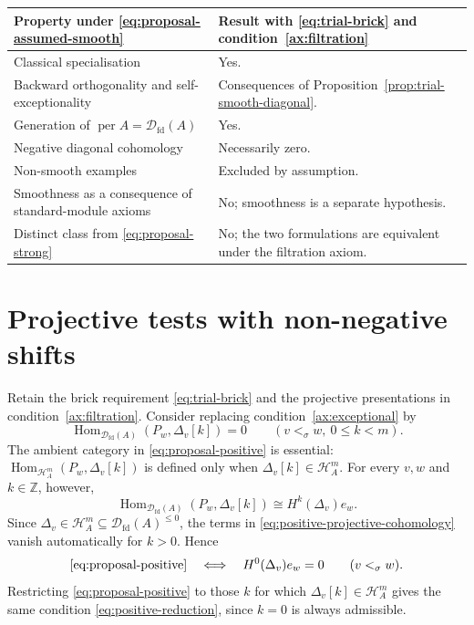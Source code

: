 \documentclass[11pt,a4paper]{article}
\newcommand{\D}{\mathcal D}
\renewcommand{\H}{\mathcal H}
\newcommand{\ZZ}{\mathbb{Z}}
\newcommand{\std}{\Delta}
\DeclareMathOperator{\fd}{fd}
\DeclareMathOperator{\Hom}{Hom}
\DeclareMathOperator{\per}{per}
\theoremstyle{plain}
\theoremstyle{definition}
\numberwithin{equation}{section}
\begin{document}
\begin{center}\small
\begin{tabularx}{\linewidth}{@{}>{\raggedright\arraybackslash}p{.36\linewidth}>{\raggedright\arraybackslash}X@{}}
\toprule
Property under \eqref{eq:proposal-assumed-smooth} & Result with
\eqref{eq:trial-brick} and condition~\ref{ax:filtration} \\\midrule
Classical specialisation & Yes.\\
Backward orthogonality and self-exceptionality & Consequences of
Proposition~\ref{prop:trial-smooth-diagonal}.\\
Generation of $\per A=\D_{\fd}(A)$ & Yes.\\
Negative diagonal cohomology & Necessarily zero.\\
Non-smooth examples & Excluded by assumption.\\
Smoothness as a consequence of standard-module axioms & No;
smoothness is a separate hypothesis.\\
Distinct class from \eqref{eq:proposal-strong} & No;
the two formulations are equivalent under the filtration axiom.\\
\bottomrule
\end{tabularx}
\end{center}

\section{Projective tests with non-negative shifts}
\label{sec:proposal-positive}

Retain the brick requirement \eqref{eq:trial-brick} and the projective
presentations in condition~\ref{ax:filtration}. Consider replacing
condition~\ref{ax:exceptional} by
\begin{equation*}\tag{P+}\label{eq:proposal-positive}
 \Hom_{\D_{\fd}(A)}(P_w,\std_v[k])=0
 \qquad(v<_\sigma w,\ 0\leq k<m).
\end{equation*}
The ambient category in \eqref{eq:proposal-positive} is essential:
$\Hom_{\H_A^m}(P_w,\std_v[k])$ is defined only when
$\std_v[k]\in\H_A^m$. For every $v,w$ and $k\in\ZZ$, however,
\begin{equation}\label{eq:positive-projective-cohomology}
 \Hom_{\D_{\fd}(A)}(P_w,\std_v[k])
 \cong H^k(\std_v)e_w.
\end{equation}
Since $\std_v\in\H_A^m\subseteq\D_{\fd}(A)^{\leq0}$,
the terms in \eqref{eq:positive-projective-cohomology} vanish
automatically for $k>0$. Hence
\begin{equation}\label{eq:positive-reduction}
 \eqref{eq:proposal-positive}
 \quad\Longleftrightarrow\quad
 H^0(\std_v)e_w=0\qquad(v<_\sigma w).
\end{equation}
Restricting \eqref{eq:proposal-positive} to those $k$ for which
$\std_v[k]\in\H_A^m$ gives the same condition
\eqref{eq:positive-reduction}, since $k=0$ is always admissible.
\end{document}
